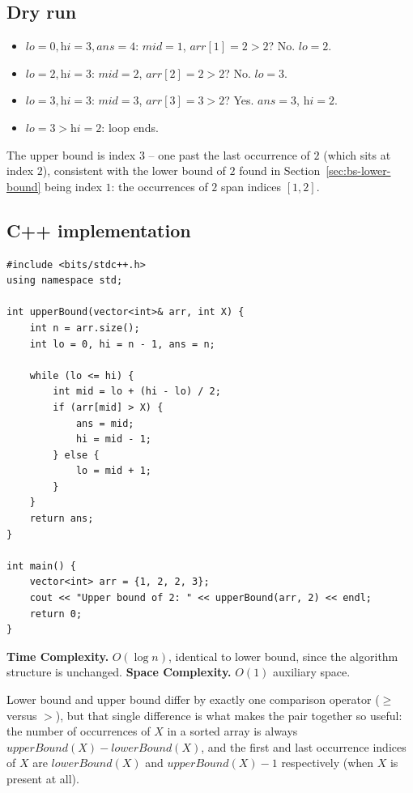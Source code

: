 \subsection*{Dry run}


\begin{itemize}
  \item $\textit{lo}=0,\textit{hi}=3,\textit{ans}=4$: $\textit{mid}=1$,
        $\textit{arr}[1]=2 > 2$? No. $\textit{lo}=2$.
  \item $\textit{lo}=2,\textit{hi}=3$: $\textit{mid}=2$,
        $\textit{arr}[2]=2 > 2$? No. $\textit{lo}=3$.
  \item $\textit{lo}=3,\textit{hi}=3$: $\textit{mid}=3$,
        $\textit{arr}[3]=3 > 2$? Yes. $\textit{ans}=3$, $\textit{hi}=2$.
  \item $\textit{lo}=3 > \textit{hi}=2$: loop ends.
\end{itemize}

The upper bound is index $3$ -- one past the last occurrence of $2$
(which sits at index $2$), consistent with the lower bound of $2$ found in
Section~\ref{sec:bs-lower-bound} being index $1$: the occurrences of $2$
span indices $[1, 2]$.

\subsection*{C++ implementation}

\begin{lstlisting}
#include <bits/stdc++.h>
using namespace std;

int upperBound(vector<int>& arr, int X) {
    int n = arr.size();
    int lo = 0, hi = n - 1, ans = n;

    while (lo <= hi) {
        int mid = lo + (hi - lo) / 2;
        if (arr[mid] > X) {
            ans = mid;
            hi = mid - 1;
        } else {
            lo = mid + 1;
        }
    }
    return ans;
}

int main() {
    vector<int> arr = {1, 2, 2, 3};
    cout << "Upper bound of 2: " << upperBound(arr, 2) << endl;
    return 0;
}
\end{lstlisting}

\begin{complexitybox}
\textbf{Time Complexity.} $O(\log n)$, identical to lower bound, since
the algorithm structure is unchanged.
\textbf{Space Complexity.} $O(1)$ auxiliary space.
\end{complexitybox}

\begin{takeawaybox}
Lower bound and upper bound differ by exactly one comparison operator
($\ge$ versus $>$), but that single difference is what makes the pair
together so useful: the number of occurrences of $X$ in a sorted array is
always $\textit{upperBound}(X) - \textit{lowerBound}(X)$, and the first and
last occurrence indices of $X$ are $\textit{lowerBound}(X)$ and
$\textit{upperBound}(X) - 1$ respectively (when $X$ is present at all).
\end{takeawaybox}
